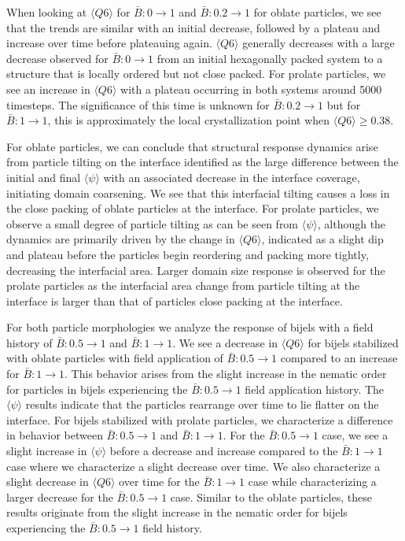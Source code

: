 When looking at \(\langle Q6 \rangle\) for \(\bar{B}: 0 \rightarrow 1\)
and \(\bar{B}: 0.2 \rightarrow 1\) for oblate particles, we see that the
trends are similar with an initial decrease, followed by a plateau and
increase over time before plateauing again. \(\langle Q6 \rangle\)
generally decreases with a large decrease observed for
\(\bar{B}: 0 \rightarrow 1\) from an initial hexagonally packed system
to a structure that is locally ordered but not close packed. For prolate
particles, we see an increase in \(\langle Q6 \rangle\) with a plateau
occurring in both systems around 5000 timesteps. The significance of
this time is unknown for \(\bar{B}: 0.2 \rightarrow 1\) but for
\(\bar{B}: 1 \rightarrow 1\), this is approximately the local
crystallization point when \(\langle Q6 \rangle \geq 0.38\).

For oblate particles, we can conclude that structural response dynamics
arise from particle tilting on the interface identified as the large
difference between the initial and final \(\langle \psi \rangle\) with
an associated decrease in the interface coverage, initiating domain
coarsening. We see that this interfacial tilting causes a loss in the
close packing of oblate particles at the interface. For prolate
particles, we observe a small degree of particle tilting as can be seen
from \(\langle \psi \rangle\), although the dynamics are primarily
driven by the change in \(\langle Q6 \rangle\), indicated as a slight
dip and plateau before the particles begin reordering and packing more
tightly, decreasing the interfacial area. Larger domain size response is
observed for the prolate particles as the interfacial area change from
particle tilting at the interface is larger than that of particles close
packing at the interface.

For both particle morphologies we analyze the response of bijels with a
field history of \(\bar{B}: 0.5 \rightarrow 1\) and
\(\bar{B}: 1 \rightarrow 1\). We see a decrease in
\(\langle Q6 \rangle\) for bijels stabilized with oblate particles with
field application of \(\bar{B}: 0.5 \rightarrow 1\) compared to an
increase for \(\bar{B}: 1 \rightarrow 1\). This behavior arises from the
slight increase in the nematic order for particles in bijels
experiencing the \(\bar{B}: 0.5 \rightarrow 1\) field application
history. The \(\langle \psi \rangle\) results indicate that the
particles rearrange over time to lie flatter on the interface. For
bijels stabilized with prolate particles, we characterize a difference
in behavior between \(\bar{B}: 0.5 \rightarrow 1\) and
\(\bar{B}: 1 \rightarrow 1\). For the \(\bar{B}: 0.5 \rightarrow 1\)
case, we see a slight increase in \(\langle \psi \rangle\) before a
decrease and increase compared to the \(\bar{B}: 1 \rightarrow 1\) case
where we characterize a slight decrease over time. We also characterize
a slight decrease in \(\langle Q6 \rangle\) over time for the
\(\bar{B}: 1 \rightarrow 1\) case while characterizing a larger decrease
for the \(\bar{B}: 0.5 \rightarrow 1\) case. Similar to the oblate
particles, these results originate from the slight increase in the
nematic order for bijels experiencing the \(\bar{B}: 0.5 \rightarrow 1\)
field history.





